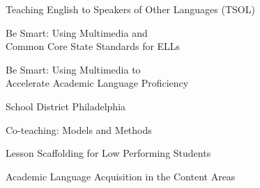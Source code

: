 \documentclass[]{scrartcl}
\begin{document}
\begin{cleanCV}
\newcommand{\TSOL}
{Teaching English to Speakers of Other Languages\\
(TESOL) Convention 2012}

\newcommand{\SDP}{School District Philadelphia}
\newcommand{\TAGGERT}{Taggart Elementary School}

\WorkExperienceX{}
{Teaching English to Speakers of Other Languages (TSOL)}{}

{Be Smart: Using Multimedia and\\Common Core State Standards for ELLs}

{Be Smart: Using Multimedia to\\ Accelerate Academic Language Proficiency }









\WorkExperienceX{}
{\SDP}{}

{Co-teaching: Models and Methods}

{Lesson Scaffolding for Low Performing Students}

{Academic Language Acquisition in the Content Areas}

\end{cleanCV}
\end{document}
